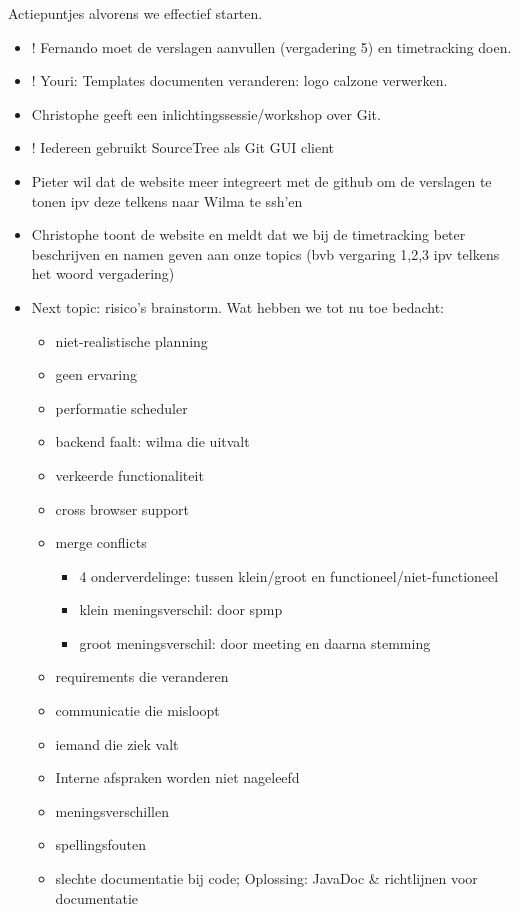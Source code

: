 Actiepuntjes alvorens we effectief starten.
\begin{itemize}
\item ! Fernando moet de verslagen aanvullen (vergadering 5) en timetracking doen.
\item ! Youri: Templates documenten veranderen: logo calzone verwerken.
\end{itemize}

\begin{itemize}
\item Christophe geeft een inlichtingssessie/workshop over Git. 
\item ! Iedereen gebruikt SourceTree als Git GUI client
\item Pieter wil dat de website meer integreert met de github om de verslagen te tonen ipv deze telkens naar Wilma te ssh'en
\item Christophe toont de website en meldt dat we bij de timetracking beter beschrijven en namen geven aan onze topics (bvb vergaring 1,2,3 ipv telkens het woord vergadering)
\item Next topic: risico's brainstorm. Wat hebben we tot nu toe bedacht:
	\begin{itemize}
	\item niet-realistische planning
	\item geen ervaring
	\item performatie scheduler
	\item backend faalt: wilma die uitvalt
	\item verkeerde functionaliteit
	\item cross browser support
	\item merge conflicts
		\begin{itemize}
		\item 4 onderverdelinge: tussen klein/groot en functioneel/niet-functioneel
		\item klein meningsverschil: door spmp
		\item groot meningsverschil: door meeting en daarna stemming
		\end{itemize}
	\item requirements die veranderen
	\item communicatie die misloopt
	\item iemand die ziek valt
	\item Interne afspraken worden niet nageleefd
	\item meningsverschillen
	\item spellingsfouten
	\item slechte documentatie bij code; Oplossing: JavaDoc & richtlijnen voor documentatie

\end{itemize}
\end{itemize}

